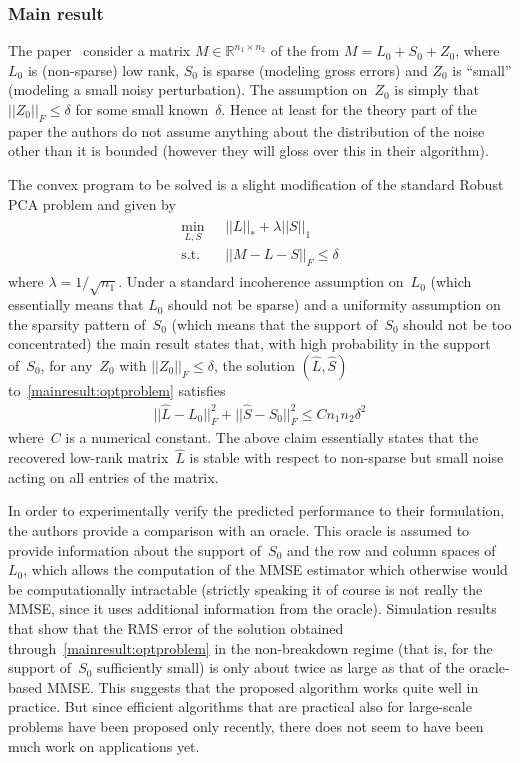 \subsubsection{Main result}

The paper~\cite{Zhou:2010vn} consider a matrix $M\in\mathbb{R}^{n_1\times n_2}$ of the from $M = L_0+S_0+Z_0$, where~$L_0$ is (non-sparse) low rank, $S_0$ is sparse (modeling gross errors) and $Z_0$ is ``small'' (modeling a small noisy perturbation). The assumption on~$Z_0$ is simply that $||Z_0||_F \leq \delta$ for some small known~$\delta$. Hence at least for the theory part of the paper the authors do not assume anything about the distribution of the noise other than it is bounded (however they will gloss over this in their algorithm).

The convex program to be solved is a slight modification of the standard Robust PCA problem and given by
\begin{align}
\begin{split}
\min_{L,S} \; &||L||_* + \lambda ||S||_1 \\
\text{s.t.} \quad &||M-L-S||_F \leq \delta
\end{split}
\label{mainresult:optproblem}
\end{align}
where $\lambda = 1/\sqrt{n_1}$. Under a standard incoherence assumption on~$L_0$ (which essentially means that $L_0$ should not be sparse) and a uniformity assumption on the sparsity pattern of~$S_0$ (which means that the support of~$S_0$ should not be too concentrated) the main result states that, with high probability in the support of~$S_0$, for any~$Z_0$ with $||Z_0||_F \leq \delta$, the solution $(\hat{L},\hat{S})$ to~\eqref{mainresult:optproblem} satisfies
\begin{align*}
||\hat{L}-L_0||_F^2 + ||\hat{S}-S_0||_F^2 \leq C n_1n_2\delta^2
\end{align*}
where~$C$ is a numerical constant. The above claim essentially states that the recovered low-rank matrix~$\hat{L}$ is stable with respect to non-sparse but small noise acting on all entries of the matrix.

In order to experimentally verify the predicted performance to their formulation, the authors provide a comparison with an oracle. This oracle is assumed to provide information about the support of~$S_0$ and the row and column spaces of~$L_0$, which allows the computation of the MMSE estimator which otherwise would be computationally intractable (strictly speaking it of course is not really the MMSE, since it uses additional information from the oracle). Simulation results that show that the RMS error of the solution obtained through~\eqref{mainresult:optproblem} in the non-breakdown regime (that is, for the support of~$S_0$ sufficiently small) is only about twice as large as that of the oracle-based MMSE. This suggests that the proposed algorithm works quite well in practice. But since efficient algorithms that are practical also for large-scale problems have been proposed only recently, there does not seem to have been much work on applications yet. 



